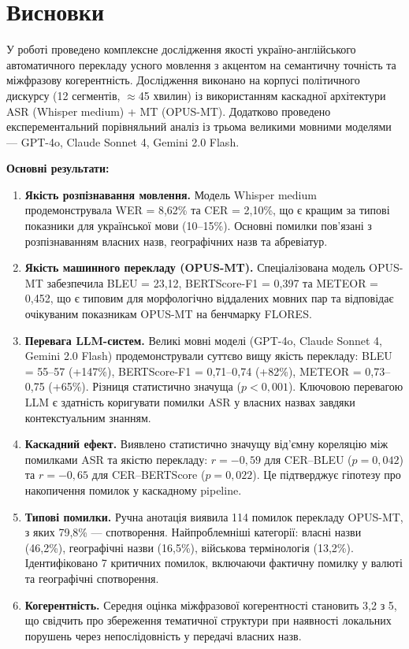 \section{Висновки}

У роботі проведено комплексне дослідження якості
україно-англійського автоматичного перекладу усного мовлення з акцентом
на семантичну точність та міжфразову когерентність. Дослідження виконано
на корпусі політичного дискурсу (12 сегментів, $\approx$45 хвилин) із
використанням каскадної архітектури ASR (Whisper medium) + MT (OPUS-MT).
Додатково проведено експерементальний порівняльний аналіз із трьома великими мовними
моделями --- GPT-4o, Claude Sonnet 4, Gemini 2.0 Flash.

\textbf{Основні результати:}

\begin{enumerate}
    \item \textbf{Якість розпізнавання мовлення.} Модель Whisper medium
    продемонструвала WER = 8,62\% та CER = 2,10\%, що є кращим за типові
    показники для української мови (10--15\%). Основні помилки пов'язані
    з розпізнаванням власних назв, географічних назв та абревіатур.

    \item \textbf{Якість машинного перекладу (OPUS-MT).} Спеціалізована
    модель OPUS-MT забезпечила BLEU = 23,12, BERTScore-F1 = 0,397 та
    METEOR = 0,452, що є типовим для морфологічно віддалених мовних пар
    та відповідає очікуваним показникам OPUS-MT на бенчмарку FLORES.

    \item \textbf{Перевага LLM-систем.} Великі мовні моделі (GPT-4o,
    Claude Sonnet 4, Gemini 2.0 Flash) продемонстрували суттєво вищу
    якість перекладу: BLEU = 55--57 (+147\%), BERTScore-F1 = 0,71--0,74
    (+82\%), METEOR = 0,73--0,75 (+65\%). Різниця статистично значуща
    ($p < 0,001$). Ключовою перевагою LLM є здатність коригувати помилки
    ASR у власних назвах завдяки контекстуальним знанням.

    \item \textbf{Каскадний ефект.} Виявлено статистично значущу від'ємну
    кореляцію між помилками ASR та якістю перекладу: $r = -0,59$ для
    CER--BLEU ($p = 0,042$) та $r = -0,65$ для CER--BERTScore ($p = 0,022$).
    Це підтверджує гіпотезу про накопичення помилок у каскадному pipeline.

    \item \textbf{Типові помилки.} Ручна анотація виявила 114 помилок
    перекладу OPUS-MT, з яких 79,8\% --- спотворення. Найпроблемніші
    категорії: власні назви (46,2\%), географічні назви (16,5\%), військова
    термінологія (13,2\%). Ідентифіковано 7 критичних помилок, включаючи
    фактичну помилку у валюті та географічні спотворення.

    \item \textbf{Когерентність.} Середня оцінка міжфразової когерентності
    становить 3,2 з 5, що свідчить про збереження тематичної структури
    при наявності локальних порушень через непослідовність у передачі
    власних назв.
\end{enumerate}


